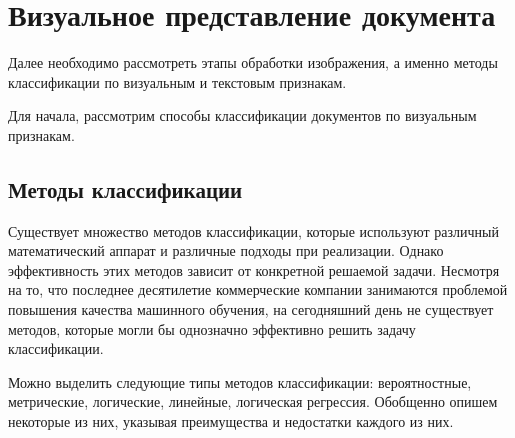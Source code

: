 \section{Визуальное представление документа}

Далее необходимо рассмотреть этапы обработки изображения, а именно методы классификации по визуальным и текстовым признакам.

Для начала, рассмотрим способы классификации документов по визуальным признакам.

\subsection{Методы классификации}

Существует множество методов классификации, которые используют различный математический аппарат и различные подходы при реализации. Однако эффективность этих методов зависит от конкретной решаемой задачи. Несмотря на то, что последнее десятилетие коммерческие компании занимаются проблемой повышения качества машинного обучения, на сегодняшний день не существует методов, которые могли бы однозначно эффективно решить задачу классификации. 

Можно выделить следующие типы методов классификации: вероятностные, метрические, логические, линейные, логическая регрессия. Обобщенно опишем некоторые из них, указывая преимущества и недостатки каждого из них. 

